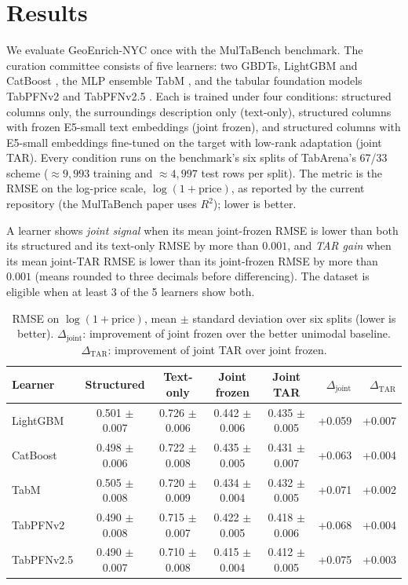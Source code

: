 \documentclass{article}
\begin{document}
\section{Results}
\label{sec:results}

We evaluate GeoEnrich-NYC once with the MulTaBench benchmark.
The curation committee consists of five learners: two GBDTs, LightGBM \citep{ke2017lightgbm} and CatBoost \citep{prokhorenkova2018catboost},
the MLP ensemble TabM \citep{gorishniy2024tabm}, and the tabular foundation models TabPFNv2 \citep{hollmann2025tabpfn} and
TabPFNv2.5 \citep{grinsztajn2025tabpfn25}.
Each is trained under four conditions: structured columns only, the surroundings description only (text-only),
structured columns with frozen E5-small \citep{wang2022e5} text embeddings (joint frozen), and structured columns with
E5-small embeddings fine-tuned on the target with low-rank adaptation \citep[LoRA;][]{hu2022lora} (joint TAR).
Every condition runs on the benchmark's six splits of TabArena's \citep{erickson2025tabarena} 67/33 scheme
($\approx 9{,}993$ training and $\approx 4{,}997$ test rows per split).
The metric is the RMSE on the log-price scale, $\log(1 + \text{price})$, as reported by the current repository (the MulTaBench paper uses $R^2$); lower is better.

A learner shows \emph{joint signal} when its mean joint-frozen RMSE is lower than both its structured and
its text-only RMSE by more than $0.001$, and \emph{TAR gain} when its mean joint-TAR RMSE is lower than its
joint-frozen RMSE by more than $0.001$ (means rounded to three decimals before differencing).
The dataset is eligible when at least 3 of the 5 learners show both.

\begin{table}[h]
  \caption{RMSE on $\log(1 + \text{price})$, mean $\pm$ standard deviation over six splits (lower is better).
    $\Delta_{\text{joint}}$: improvement of joint frozen over the better unimodal baseline.
    $\Delta_{\text{TAR}}$: improvement of joint TAR over joint frozen.}
  \label{tab:results}
  \centering
  \small
  \begin{tabular}{lccccrr}
    \toprule
    Learner & Structured & Text-only & Joint frozen & Joint TAR & $\Delta_{\text{joint}}$ & $\Delta_{\text{TAR}}$ \\
    \midrule
    LightGBM   & 0.501 $\pm$ 0.007 & 0.726 $\pm$ 0.006 & 0.442 $\pm$ 0.006 & 0.435 $\pm$ 0.005 & +0.059 & +0.007 \\
    CatBoost   & 0.498 $\pm$ 0.006 & 0.722 $\pm$ 0.008 & 0.435 $\pm$ 0.005 & 0.431 $\pm$ 0.007 & +0.063 & +0.004 \\
    TabM       & 0.505 $\pm$ 0.008 & 0.720 $\pm$ 0.009 & 0.434 $\pm$ 0.004 & 0.432 $\pm$ 0.005 & +0.071 & +0.002 \\
    TabPFNv2   & 0.490 $\pm$ 0.008 & 0.715 $\pm$ 0.007 & 0.422 $\pm$ 0.005 & 0.418 $\pm$ 0.006 & +0.068 & +0.004 \\
    TabPFNv2.5 & 0.490 $\pm$ 0.007 & 0.710 $\pm$ 0.008 & 0.415 $\pm$ 0.004 & 0.412 $\pm$ 0.005 & +0.075 & +0.003 \\
    \bottomrule
  \end{tabular}
\end{table}
\end{document}
